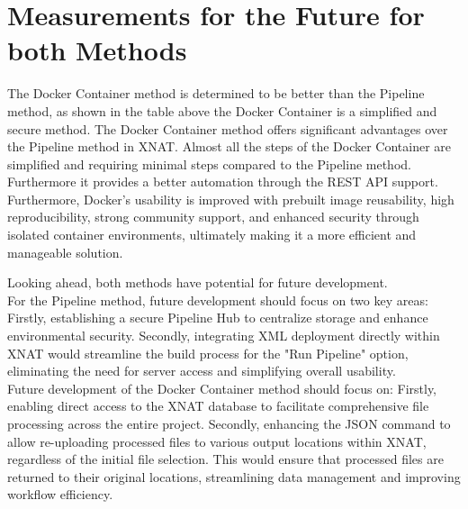  
\section{Measurements for the Future for both Methods}

The Docker Container method is determined to be better than the Pipeline method, as shown in the table above the Docker Container is a simplified and secure method.  
The Docker Container method offers significant advantages over the Pipeline method in XNAT.
Almost all the steps of the Docker Container are simplified and requiring minimal steps compared to the Pipeline method. Furthermore it provides a better automation through the REST API support.  Furthermore, Docker's usability is improved with prebuilt image reusability, high reproducibility, strong community support, and enhanced security through isolated container environments, ultimately making it a more efficient and manageable solution.

Looking ahead, both methods have potential for future development.\\
For the Pipeline method, future development should focus on two key areas: Firstly, establishing a secure Pipeline Hub to centralize storage and enhance environmental security. Secondly, integrating XML deployment directly within XNAT would streamline the build process for the "Run Pipeline" option, eliminating the need for server access and simplifying overall usability.\\
Future development of the Docker Container method should focus on: Firstly, enabling direct access to the XNAT database to facilitate comprehensive file processing across the entire project. Secondly, enhancing the JSON command to allow re-uploading processed files to various output locations within XNAT, regardless of the initial file selection. This would ensure that processed files are returned to their original locations, streamlining data management and improving workflow efficiency.
